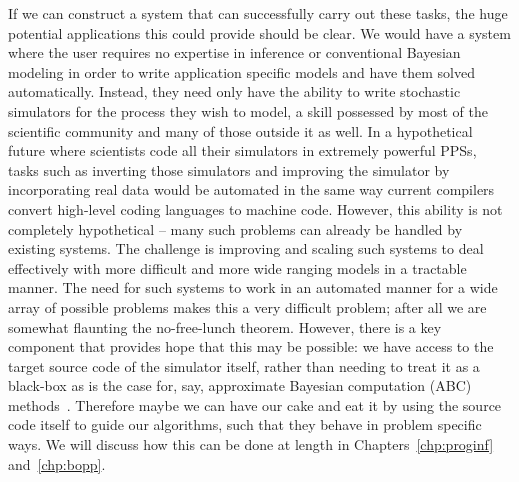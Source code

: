 If we can construct a system that can successfully carry out these tasks, 
the huge potential applications this could provide should be clear. We would have a 
system where the user requires no expertise in inference or conventional
Bayesian modeling in order to write application specific models and have them solved automatically.
Instead, they need only have the ability to write stochastic simulators for the process they wish to
model, a skill possessed by most of the scientific community and many of those outside it as well.
In a hypothetical future where scientists
code all their simulators in extremely powerful PPSs, tasks such as
inverting those simulators and improving the simulator by incorporating real data would
be automated in the same way current compilers convert high-level coding languages to machine code.  
However, this ability is not completely
hypothetical -- many such problems can already be handled by existing systems.  The challenge
is improving and scaling such systems to deal effectively with more difficult and more wide ranging models
in a tractable manner.  The need for such systems to work in an automated manner for a wide array
of possible problems makes this a very difficult problem; after all we are somewhat flaunting the no-free-lunch
theorem.  However, there is a key component that provides hope that this may be possible: we have access
to the target source code of the simulator itself, rather than needing to treat it as a black-box as is the
case for, say, approximate Bayesian computation (ABC) methods~\citep{csillery2010approximate}.  Therefore
maybe we can have our cake and eat it by using the source code itself to guide our algorithms, such that
they behave in problem specific ways.  We will discuss how this can be done at length in 
Chapters~\ref{chp:proginf} and~\ref{chp:bopp}.